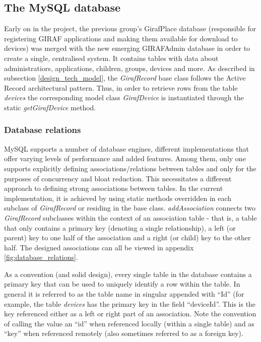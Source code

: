 \subsection{The MySQL database}
Early on in the project, the previous group's GirafPlace database (responsible for registering GIRAF applications and making them available for download to devices) was merged with the new emerging GIRAFAdmin database in order to create a single, centralised system. It contains tables with data about administratiors, applications, children, groups, devices and more.
As described in subsection \vref{design_tech_model}, the \emph{GirafRecord} base class follows the Active Record architectural pattern. Thus, in order to retrieve rows from the table \emph{devices} the corresponding model class \emph{GirafDevice} is instantiated through the static \emph{getGirafDevice} method.

\subsubsection{Database relations}
MySQL supports a number of database engines, different implementations that offer varying levels of performance and added features. Among them, only one supports explicitly defining associations/relations between tables and only for the purposes of concurrency and bloat reduction. This necessitates a different approach to defining strong associations between tables. In the current implementation, it is achieved by using static methods overridden in each subclass of \emph{GirafRecord} or residing in the base class.
\emph{addAssociation} connects two \emph{GirafRecord} subclasses within the context of an association table - that is, a table that only contains a primary key (denoting a single relationship), a left (or parent) key to one half of the association and a right (or child) key to the other half. The designed associations can all be viewed in appendix \vref{fig:database_relations}.

As a convention (and solid design), every single table in the database contains a primary key that can be used to uniquely identify a row within the table. In general it is referred to as the table name in singular appended with ``Id'' (for example, the table \emph{devices} has the primary key in the field ``deviceId''. This is the key referenced either as a left or right part of an association. Note the convention of calling the value an ``id'' when referenced locally (within a single table) and as ``key'' when referenced remotely (also sometimes referred to as a foreign key).

